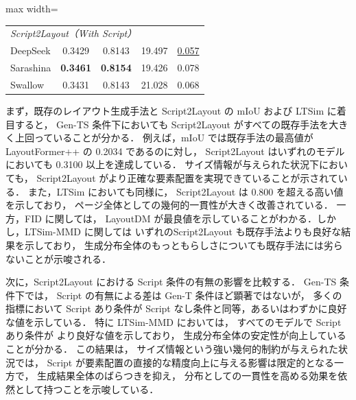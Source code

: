\documentclass[a4j,12pt,dvipdfmx]{jsreport}
\begin{document}
\begin{table}[h]
\begin{adjustbox}{max width=\textwidth}
\begin{tabular}{l c c c c}
      \multicolumn{5}{l}{\itshape Script2Layout（With Script）}                                                                                                             \\
      DeepSeek
                                                      & 0.3429                                              & 0.8143             & 19.497             & \underline{0.057} \\
      Sarashina
                                                      & \textbf{0.3461}                                     & \textbf{0.8154}    & 19.426             & 0.078             \\
      Swallow
                                                      & 0.3431                                              & 0.8143             & 21.028             & 0.068             \\
      \bottomrule
    \end{tabular}
  \end{adjustbox}
\end{table}

まず，既存のレイアウト生成手法と Script2Layout の
mIoU および LTSim に着目すると，
Gen-TS 条件下においても Script2Layout がすべての既存手法を大きく上回っていることが分かる．
例えば，mIoU では既存手法の最高値が LayoutFormer++ の 0.2034 であるのに対し，
Script2Layout はいずれのモデルにおいても 0.3100 以上を達成している．
サイズ情報が与えられた状況下においても，
Script2Layout がより正確な要素配置を実現できていることが示されている．
また，LTSim においても同様に，
Script2Layout は 0.800 を超える高い値を示しており，
ページ全体としての幾何的一貫性が大きく改善されている．
一方，FID に関しては，
LayoutDM が最良値を示していることがわかる．しかし，LTSim-MMD に関しては
いずれのScript2Layout も既存手法よりも良好な結果を示しており，
生成分布全体のもっともらしさについても既存手法には劣らないことが示唆される．

次に，Script2Layout における Script 条件の有無の影響を比較する．
Gen-TS 条件下では，
Script の有無による差は Gen-T 条件ほど顕著ではないが，
多くの指標において Script あり条件が
Script なし条件と同等，あるいはわずかに良好な値を示している．
特に LTSim-MMD においては，
すべてのモデルで Script あり条件が
より良好な値を示しており，
生成分布全体の安定性が向上していることが分かる．
この結果は，
サイズ情報という強い幾何的制約が与えられた状況では，
Script が要素配置の直接的な精度向上に与える影響は限定的となる一方で，
生成結果全体のばらつきを抑え，
分布としての一貫性を高める効果を依然として持つことを示唆している．
\end{document}

